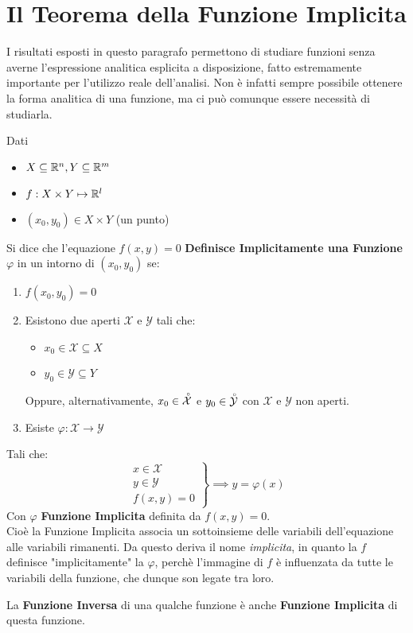 \newpage
\section{Il Teorema della Funzione Implicita}
I risultati esposti in questo paragrafo permettono di studiare funzioni senza averne l'espressione analitica esplicita a disposizione, fatto estremamente importante per l'utilizzo reale dell'analisi. Non è infatti sempre possibile ottenere la forma analitica di una funzione, ma ci può comunque essere necessità di studiarla.
\begin{definition}
	\label{def:funz_impl}
	Dati
	\begin{itemize}[noitemsep]
		\item $X \subseteq \mathbb{R}^n, Y \subseteq \mathbb{R}^m$
		\item $f: X \times Y \mapsto \mathbb{R}^l$
		\item $(x_0, y_0) \in X \times Y$ (un punto)
	\end{itemize}
	Si dice che l'equazione $f(x,y) = 0$ \textbf{Definisce Implicitamente una Funzione} $\varphi$ in un intorno di $(x_0,y_0)$ se:
	\begin{enumerate}
		\item $f(x_0,y_0) = 0$
		\item Esistono due aperti $\mathcal{X}$ e $\mathcal{Y}$ tali che:
			\begin{itemize}[noitemsep, topsep=0pt]
				\item $x_0 \in \mathcal{X} \subseteq X$
				\item $y_0 \in \mathcal{Y} \subseteq Y$
			\end{itemize}
			\begin{note}
				Oppure, alternativamente, $x_0 \in \accentset{\circ}{\mathcal{X}}$ e $y_0 \in \accentset{\circ}{\mathcal{Y}}$ con $\mathcal{X}$ e $\mathcal{Y}$ non aperti.
			\end{note}\vspace*{-2ex}
		\item Esiste $\varphi: \mathcal{X} \to \mathcal{Y}$
	\end{enumerate}
	Tali che:
	\[
		\left.
		\begin{array}{l}
			x \in \mathcal{X}\\
			y \in \mathcal{Y}\\
			f(x,y) = 0
		\end{array}
		\right\}
		\implies
		y = \varphi(x)
	\]
	Con $\varphi$ \textbf{Funzione Implicita} definita da $f(x,y)=0$.\\

	Cioè la Funzione Implicita associa un sottoinsieme delle variabili dell'equazione alle variabili rimanenti. Da questo deriva il nome \textit{implicita}, in quanto la $f$ definisce "implicitamente" la $\varphi$, perchè l'immagine di $f$ è influenzata da tutte le variabili della funzione, che dunque son legate tra loro.
	\begin{note}
		La \textbf{Funzione Inversa} di una qualche funzione è anche \textbf{Funzione Implicita} di questa funzione.
	\end{note}
\end{definition}

